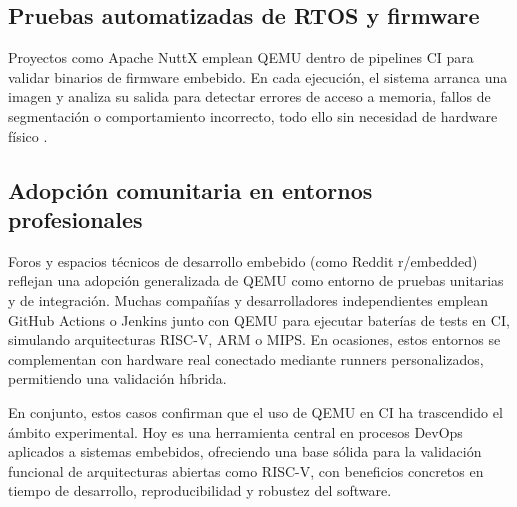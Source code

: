 \subsection*{Pruebas automatizadas de RTOS y firmware}

Proyectos como Apache NuttX emplean QEMU dentro de pipelines CI para validar binarios de firmware embebido. En cada ejecución, el sistema arranca una imagen y analiza su salida para detectar errores de acceso a memoria, fallos de segmentación o comportamiento incorrecto, todo ello sin necesidad de hardware físico .

\subsection*{Adopción comunitaria en entornos profesionales}

Foros y espacios técnicos de desarrollo embebido (como Reddit r/embedded) reflejan una adopción generalizada de QEMU como entorno de pruebas unitarias y de integración. Muchas compañías y desarrolladores independientes emplean GitHub Actions o Jenkins junto con QEMU para ejecutar baterías de tests en CI, simulando arquitecturas RISC-V, ARM o MIPS. En ocasiones, estos entornos se complementan con hardware real conectado mediante runners personalizados, permitiendo una validación híbrida.

\vspace{1em}
En conjunto, estos casos confirman que el uso de QEMU en CI ha trascendido el ámbito experimental. Hoy es una herramienta central en procesos DevOps aplicados a sistemas embebidos, ofreciendo una base sólida para la validación funcional de arquitecturas abiertas como RISC-V, con beneficios concretos en tiempo de desarrollo, reproducibilidad y robustez del software.






